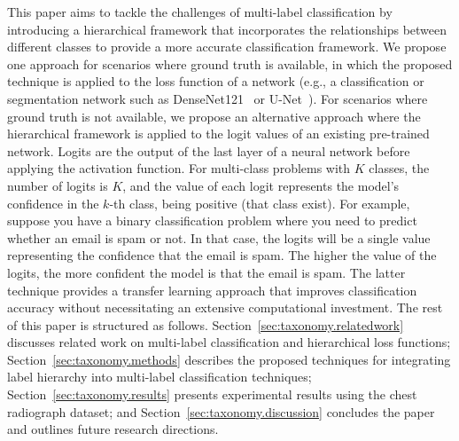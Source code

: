 This paper aims to tackle the challenges of multi-label classification by introducing a hierarchical framework that incorporates the relationships between different classes to provide a more accurate classification framework. We propose one approach for scenarios where ground truth is available, in which the proposed technique is applied to the loss function of a network (e.g., a classification or segmentation network such as DenseNet121~\cite{huang_Densely_2017} or U-Net~\cite{ronneberger_UNet_2015}). For scenarios where ground truth is not available, we propose an alternative approach where the hierarchical framework is applied to the logit values of an existing pre-trained network. Logits are the output of the last layer of a neural network before applying the activation function. For multi-class problems with $K$ classes, the number of logits is $K$, and the value of each logit represents the model’s confidence in the $k$-th class, being positive (that class exist). For example, suppose you have a binary classification problem where you need to predict whether an email is spam or not. In that case, the logits will be a single value representing the confidence that the email is spam. The higher the value of the logits, the more confident the model is that the email is spam.
The latter technique provides a transfer learning approach that improves classification accuracy without necessitating an extensive computational investment. The rest of this paper is structured as follows. Section~\ref{sec:taxonomy.relatedwork} discusses related work on multi-label classification and hierarchical loss functions; Section~\ref{sec:taxonomy.methods} describes the proposed techniques for integrating label hierarchy into multi-label classification techniques; Section~\ref{sec:taxonomy.results} presents experimental results using the chest radiograph dataset; and Section~\ref{sec:taxonomy.discussion} concludes the paper and outlines future research directions.
